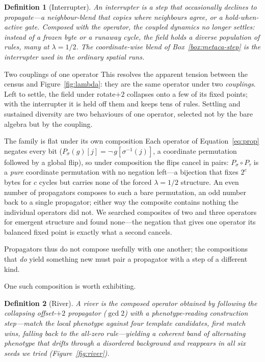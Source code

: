 \documentclass[man,12pt,floatsintext]{apa7}
\newcommand{\sig}{\sigma}
\newtheorem{definition}{Definition}
\begin{document}
\begin{definition}[Interrupter]\label{def:interrupter}
An \emph{interrupter} is a step that occasionally declines to propagate---a
neighbour-blend that copies where neighbours agree, or a hold-when-active gate.
Composed with the operator, the coupled dynamics no longer settles: instead of a
frozen byte or a runaway cycle, the field holds a diverse population of rules,
many at $\lambda = 1/2$. The coordinate-wise blend of Box~\ref{box:metaca-step}
is the interrupter used in the ordinary spatial runs.
\end{definition}

\begin{observation}[label={obs:couplings}]{Two couplings of one operator}
This resolves the apparent tension between the census and
Figure~\ref{fig:lambda}: they are the same operator under two \emph{couplings}.
Left to settle, the field under rotate$+2$ collapses onto a few of its fixed
points; with the interrupter it is held off them and keeps tens of rules.
Settling and sustained diversity are two behaviours of one operator, selected
not by the bare algebra but by the coupling.
\end{observation}

\begin{observation}[label={obs:flat}]{The family is flat under its own composition}
Each operator of Equation~\eqref{eq:prop} negates every bit
($P_\sig(g)[j] = \lnot\,g[\sig^{-1}(j)]$, a coordinate permutation followed by a
global flip), so under composition the flips cancel in pairs: $P_\sig \circ
P_\tau$ is a \emph{pure} coordinate permutation with no negation left---a
bijection that fixes $2^{c}$ bytes for $c$ cycles but carries none of the forced
$\lambda = 1/2$ structure. An even number of propagators composes to such a bare
permutation, an odd number back to a single propagator; either way the composite
contains nothing the individual operators did not. We searched composites of two
and three operators for emergent structure and found none---the negation that
gives one operator its balanced fixed point is exactly what a second cancels.
\end{observation}

Propagators thus do not compose usefully with one another; the compositions that
\emph{do} yield something new must pair a propagator with a step of a different
kind.

One such composition is worth exhibiting.

\begin{definition}[River]\label{def:river}
A \emph{river} is the composed operator obtained by following the collapsing
offset-$+2$ propagator ($\gcd 2$) with a phenotype-reading construction
step---match the local phenotype against four template candidates, first match
wins, falling back to the all-zero rule---yielding a coherent band of
alternating phenotype that drifts through a disordered background and reappears
in all six seeds we tried (Figure~\ref{fig:river}).
\end{definition}
\end{document}
